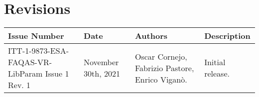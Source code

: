
\section*{Revisions}
\label{sec:revisions}

\setlength\LTleft{0pt}
\setlength\LTright{0pt}
\scriptsize
\begin{longtable}{|p{2cm}|p{2cm}|p{2cm}|p{7cm}|@{}}
\label{table:codeoperators} \\
\hline
\textbf{Issue Number}&\textbf{Date}&\textbf{Authors}&\textbf{Description}\\
\hline
ITT-1-9873-ESA-FAQAS-VR-LibParam
Issue 1 Rev. 1&
November 30th, 2021&
Oscar Cornejo, Fabrizio Pastore, Enrico Viganò.&
\begin{minipage}{8cm}
Initial release.
\end{minipage}
\hline




\end{longtable}
\normalsize

\clearpage
